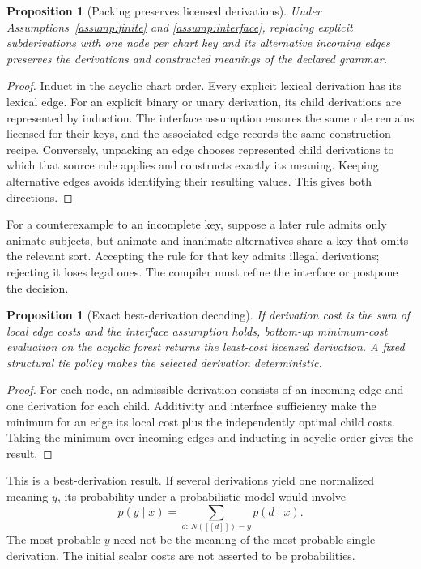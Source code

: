 \documentclass[11pt,a4paper]{article}
\newtheorem{proposition}[definition]{Proposition}
\newcommand{\sem}[1]{\left[\!\left[#1\right]\!\right]}
\begin{document}
\begin{proposition}[Packing preserves licensed derivations]\label{prop:packing}
Under Assumptions~\ref{assump:finite} and \ref{assump:interface}, replacing
explicit subderivations with one node per chart key and its alternative
incoming edges preserves the derivations and constructed meanings of the
declared grammar.
\end{proposition}
\begin{proof}
Induct in the acyclic chart order. Every explicit lexical derivation has its
lexical edge. For an explicit binary or unary derivation, its child
derivations are represented by induction. The interface assumption ensures
the same rule remains licensed for their keys, and the associated edge
records the same construction recipe. Conversely, unpacking an edge chooses
represented child derivations to which that source rule applies and
constructs exactly its meaning. Keeping alternative edges avoids identifying
their resulting values. This gives both directions.
\end{proof}

For a counterexample to an incomplete key, suppose a later rule admits only
animate subjects, but animate and inanimate alternatives share a key that
omits the relevant sort. Accepting the rule for that key admits illegal
derivations; rejecting it loses legal ones. The compiler must refine the
interface or postpone the decision.

\begin{proposition}[Exact best-derivation decoding]\label{prop:viterbi}
If derivation cost is the sum of local edge costs and the interface
assumption holds, bottom-up minimum-cost evaluation on the acyclic forest
returns the least-cost licensed derivation. A fixed structural tie policy
makes the selected derivation deterministic.
\end{proposition}
\begin{proof}
For each node, an admissible derivation consists of an incoming edge and one
derivation for each child. Additivity and interface sufficiency make the
minimum for an edge its local cost plus the independently optimal child
costs. Taking the minimum over incoming edges and inducting in acyclic order
gives the result.
\end{proof}

This is a best-derivation result. If several derivations yield one normalized
meaning \(y\), its probability under a probabilistic model would involve
\[
  p(y\mid x)=\sum_{d:\,N(\sem d)=y}p(d\mid x).
\]
The most probable \(y\) need not be the meaning of the most probable single
derivation. The initial scalar costs are not asserted to be probabilities.
\end{document}
